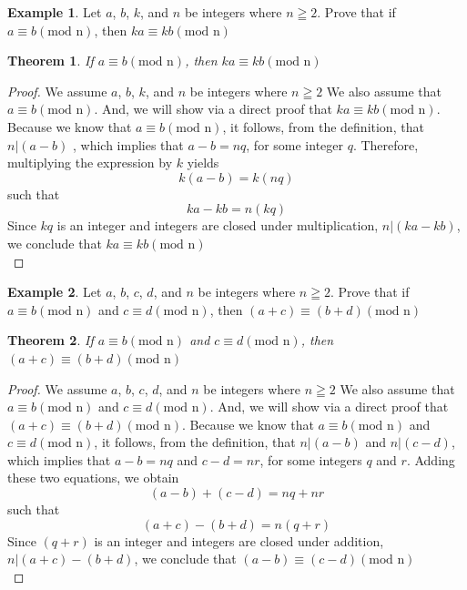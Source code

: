 \documentclass{book}
\newtheorem{theorem}{Theorem}[section]
\theoremstyle{definition}
\newtheorem{example}{Example}[definition]
\theoremstyle{remark}
\begin{document}
\begin{example}
Let $a$, $b$, $k$, and $n$ be integers where $n \geqq 2$. Prove that if $a \equiv b (\text{mod n})$, then $ka \equiv kb (\text{mod n})$

\begin{tcolorbox}
	\begin{theorem}
		If $a \equiv b (\text{mod n})$, then $ka \equiv kb (\text{mod n})$
	\end{theorem}
\end{tcolorbox}

\begin{proof}
We assume $a$, $b$, $k$, and $n$ be integers where $n \geqq 2$ We also assume that $a \equiv b (\text{mod n})$. And, we will show via a direct proof that $ka \equiv kb (\text{mod n})$. Because we know that $a \equiv b (\text{mod n})$, it follows, from the definition, that   $n | (a-b)$ , which implies that $a-b = nq$, for some integer $q$. Therefore, multiplying the expression by $k$ yields \[ k(a-b) = k(nq) \] such that \[ka - kb = n(kq) \]
Since $kq$ is an integer and integers are closed under multiplication, $n | (ka - kb)$, we conclude that $ka \equiv kb (\text{mod n})$ \\
\end{proof}
\end{example}



\begin{example}
Let $a$, $b$, $c$, $d$, and $n$ be integers where $n \geqq 2$. Prove that if $a \equiv b (\text{mod n})$ and $c \equiv d (\text{mod n})$, then $ (a + c) \equiv (b + d) (\text{mod n})$

\begin{tcolorbox}
	\begin{theorem}
		If $a \equiv b (\text{mod n})$ and $c \equiv d (\text{mod n})$, then $(a + c) \equiv (b + d) (\text{mod n})$
	\end{theorem}
\end{tcolorbox}

\begin{proof}
We assume $a$, $b$, $c$, $d$, and $n$ be integers where $n \geqq 2$ We also assume that $a \equiv b (\text{mod n})$ and $c \equiv d (\text{mod n})$. And, we will show via a direct proof that $(a + c) \equiv (b + d) (\text{mod n})$. Because we know that $a \equiv b (\text{mod n})$ and $c \equiv d (\text{mod n})$, it follows, from the definition, that   $n | (a-b)$ and $n | (c-d)$, which implies that $a-b = nq$ and $c-d = nr$, for some integers $q$ and $r$. Adding these two equations, we obtain \[ (a-b) + (c-d) = nq + nr \]such that \[ (a+c) - (b+d) = n(q + r) \] 
Since $(q + r)$ is an integer and integers are closed under addition, $n | (a+c) - (b+d)$, we conclude that $(a-b) \equiv (c-d) (\text{mod n})$ \\
\end{proof}
\end{example}
\end{document}
